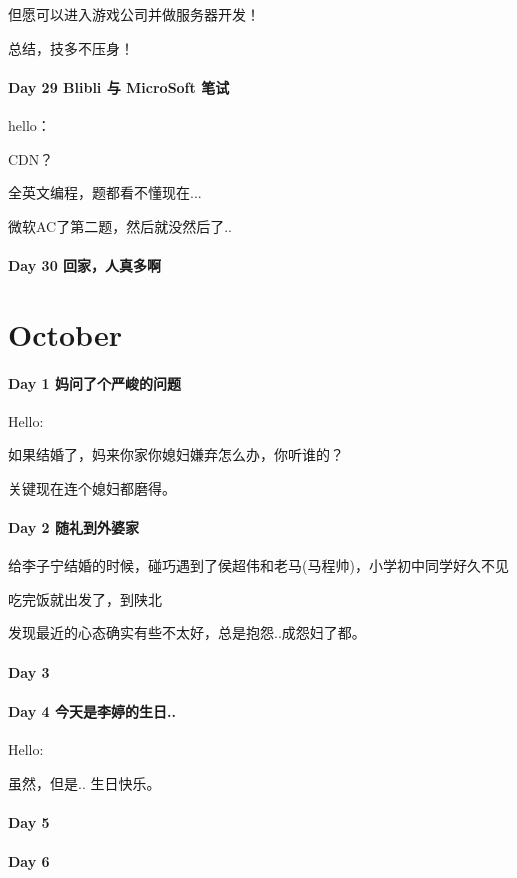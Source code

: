 \documentclass[UTF8,a4paper,8pt]{ctexart}
\begin{document}
	 	 但愿可以进入游戏公司并做服务器开发！
	 	 
	 	 总结，技多不压身！
	 	 
 	 \paragraph{Day 29   Blibli 与 MicroSoft 笔试   \quad     }hello：
 	 
	 	 CDN？
	 	 
	 	 全英文编程，题都看不懂现在...
	 	 
	 	 微软AC了第二题，然后就没然后了..   
 	 \paragraph{Day 30   回家，人真多啊   \quad     }
 \section{October}
 	 \paragraph{Day 1  妈问了个严峻的问题     \quad     }
	 	 Hello:
	 	 
	 	 如果结婚了，妈来你家你媳妇嫌弃怎么办，你听谁的？
	 	 
	 	 关键现在连个媳妇都磨得。
 	 \paragraph{Day 2  随礼到外婆家     \quad     }
	 	 给李子宁结婚的时候，碰巧遇到了侯超伟和老马(马程帅)，小学初中同学好久不见
	 	 
	 	 吃完饭就出发了，到陕北
	 	 
	 	 发现最近的心态确实有些不太好，总是抱怨..成怨妇了都。
	 	 
	 	 
 	 \paragraph{Day 3       \quad     }
 	 \paragraph{Day 4   今天是李婷的生日..    \quad     }
	 	 Hello:
	 	 
	 	 虽然，但是.. 生日快乐。
 	 \paragraph{Day 5       \quad     }
 	 \paragraph{Day 6       \quad     }
\end{document}
